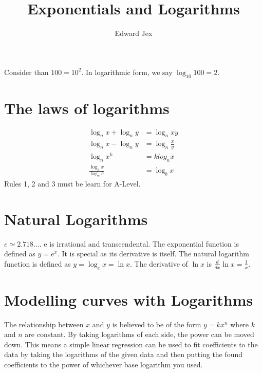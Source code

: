 \documentclass[a4paper,12pt]{article}
\begin{document}
\title{Exponentials and Logarithms}	
\author{Edward Jex}
\maketitle
Consider than $100 = 10^2$. In logarithmic form, we say $\log_{10} 100 = 2$.

\section*{The laws of logarithms}
\begin{align}
\log_n x + \log_n y & = \log_n xy \\
\log_n x - \log_n y & = \log_n \frac{x}{y} \\
\log_n x^k & = k log_n x \\
\frac{\log_a x}{\log_a b} & = \log_b x 
\end{align}
Rules 1, 2 and 3 must be learn for A-Level.

\section*{Natural Logarithms}
$e \simeq 2.718\dots$. e is irrational and transcendental. The exponential function is defined as $y = e^x$. It is special as its derivative is itself. The natural logarithm function is defined as $y = \log_e x = \ln x$. The derivative of $\ln x$ is $\frac{d}{dx} \ln x = \frac{1}{x}$.

\section*{Modelling curves with Logarithms}
The relationship between $x$ and $y$ is believed to be of the form $y = k x^n$ where $k$ and $n$ are constant. By taking logarithms of each side, the power can be moved down. This means a simple linear regression can be used to fit coefficients to the data by taking the logarithms of the given data and then putting the found coefficients to the power of whichever base logarithm you used.
\end{document}
